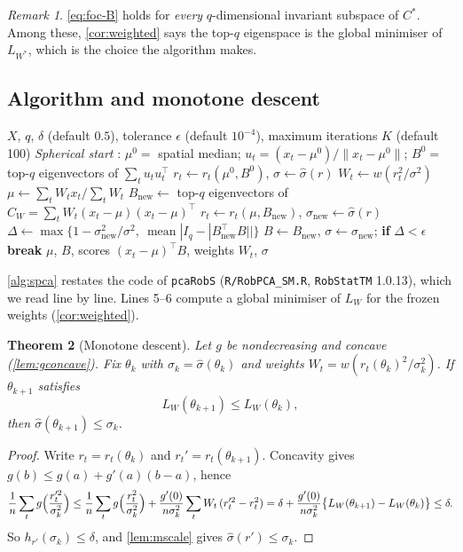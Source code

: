 \documentclass[11pt]{article}
\newtheorem{theorem}{Theorem}[section]
\theoremstyle{definition}
\theoremstyle{remark}
\newtheorem{remark}[theorem]{Remark}
\newcommand{\norm}[1]{\lVert #1\rVert}
\begin{document}
\begin{remark}
\eqref{eq:foc-B} holds for \emph{every} $q$-dimensional invariant subspace of $C^*$. Among these,
\cref{cor:weighted} says the top-$q$ eigenspace is the global minimiser of $L_{W^*}$, which is the choice
the algorithm makes.
\end{remark}

\subsection{Algorithm and monotone descent}

\begin{algorithm}[t]
\caption{S-PCA by iteratively reweighted least squares (\texttt{RobStatTM::pcaRobS})}\label{alg:spca}
\begin{algorithmic}[1]
\Require $X$, $q$, $\delta$ (default $0.5$), tolerance $\epsilon$ (default $10^{-4}$), maximum iterations $K$ (default 100)
\State \emph{Spherical start} \citep{Locantore1999}: $\mu^0=$ spatial median; $u_t=(x_t-\mu^0)/\norm{x_t-\mu^0}$;
$B^0=$ top-$q$ eigenvectors of $\sum_tu_tu_t^\top$
\State $r_t\gets r_t(\mu^0,B^0)$, $\sigma\gets\hat\sigma(r)$
\State $W_t\gets w(r_t^2/\sigma^2)$ 
\State $\mu\gets\sum_tW_tx_t/\sum_tW_t$
\State $B_{\text{new}}\gets$ top-$q$ eigenvectors of $C_W=\sum_tW_t(x_t-\mu)(x_t-\mu)^\top$
\State $r_t\gets r_t(\mu,B_{\text{new}})$, $\sigma_{\text{new}}\gets\hat\sigma(r)$
\State $\Delta\gets\max\bigl\{1-\sigma_{\text{new}}^2/\sigma^2,\ \operatorname{mean}|I_q-|B_{\text{new}}^\top B||\bigr\}$
\State $B\gets B_{\text{new}}$, $\sigma\gets\sigma_{\text{new}}$; \textbf{if} $\Delta<\epsilon$ \textbf{break}
\EndFor
\State \Return $\mu$, $B$, scores $(x_t-\mu)^\top B$, weights $W_t$, $\sigma$
\end{algorithmic}
\end{algorithm}

\cref{alg:spca} restates the code of \texttt{pcaRobS} (\texttt{R/RobPCA\_SM.R}, \texttt{RobStatTM} 1.0.13), which we
read line by line. Lines 5--6 compute a global minimiser of $L_W$ for the frozen weights (\cref{cor:weighted}).

\begin{theorem}[Monotone descent]\label{thm:descent}
Let $g$ be nondecreasing and concave (\cref{lem:gconcave}). Fix $\theta_k$ with $\sigma_k=\hat\sigma(\theta_k)$
and weights $W_t=w(r_t(\theta_k)^2/\sigma_k^2)$. If $\theta_{k+1}$ satisfies
\begin{equation}\label{eq:decrease}
L_W(\theta_{k+1})\le L_W(\theta_k),
\end{equation}
then $\hat\sigma(\theta_{k+1})\le\sigma_k$.
\end{theorem}
\begin{proof}
Write $r_t=r_t(\theta_k)$ and $r_t'=r_t(\theta_{k+1})$. Concavity gives $g(b)\le g(a)+g'(a)(b-a)$, hence
\[
\frac1n\sum_tg\Bigl(\frac{r_t'^2}{\sigma_k^2}\Bigr)
\le\frac1n\sum_tg\Bigl(\frac{r_t^2}{\sigma_k^2}\Bigr)+\frac{g'(0)}{n\sigma_k^2}\sum_tW_t\,(r_t'^2-r_t^2)
=\delta+\frac{g'(0)}{n\sigma_k^2}\bigl\{L_W(\theta_{k+1})-L_W(\theta_k)\bigr\}\le\delta .
\]
So $h_{r'}(\sigma_k)\le\delta$, and \cref{lem:mscale} gives $\hat\sigma(r')\le\sigma_k$.
\end{proof}
\end{document}
